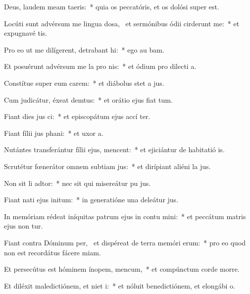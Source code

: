 \item Deus, laudem meam  taeris:~* quia os peccatóris, et os dolósi super   est.
\item Locúti sunt advérsum me lingua dosa,~\pscross{} et sermónibus ódii cirderunt me:~* et expugnavé  tis.
\item Pro eo ut me dilígerent, detrabant hi:~* ego au bam.
\item Et posuérunt advérsum me la pro nis:~* et ódium pro dilecti a.
\item Constítue super eum carem:~* et diábolus stet a  jus.
\item Cum judicátur, éxeat demtus:~* et orátio ejus fiat  tum.
\item Fiant dies jus ci:~* et episcopátum ejus accí ter.
\item Fiant fílii jus phani:~* et uxor  a.
\item Nutántes transferántur fílii ejus,  mencent:~* et ejiciántur de habitatió is.
\item Scrutétur fœnerátor omnem subtiam jus:~* et dirípiant aliéni la jus.
\item Non sit li adtor:~* nec sit qui misereátur pu jus.
\item Fiant nati ejus  initum:~* in generatióne una deleátur  jus.
\item In memóriam rédeat iníquitas patrum ejus in contu mini:~* et peccátum matris ejus non tur.
\item Fiant contra Dóminum per,~\pscross{} et dispéreat de terra memóri erum:~* pro eo quod non est recordátus fácere miam.
\item Et persecútus est hóminem ínopem,  mencum,~* et compúnctum corde morre.
\item Et diléxit maledictiónem, et niet i:~* et nóluit benedictiónem, et elongábi  o.
